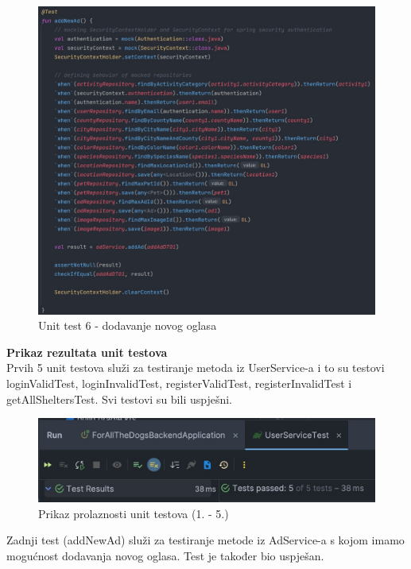 \begin{figure}[H]
			\includegraphics[scale=0.5]{slike/unit6.PNG} 
			\centering
			\caption{Unit test 6 - dodavanje novog oglasa}
			\label{unit6}
		\end{figure}

\pagebreak
		
\textbf{Prikaz rezultata unit testova}\\

Prvih 5 unit testova služi za testiranje metoda iz UserService-a i to su testovi loginValidTest, loginInvalidTest, registerValidTest, registerInvalidTest i getAllSheltersTest. Svi testovi su bili uspješni.

\begin{figure}[H]
			\includegraphics[scale=0.45]{slike/5unitrez.PNG} 
			\centering
			\caption{Prikaz prolaznosti unit testova (1. - 5.)}
			\label{unit6}
		\end{figure}
		
		
Zadnji test (addNewAd) služi za testiranje metode iz AdService-a s kojom imamo mogućnost dodavanja novog oglasa. Test je također bio uspješan.

